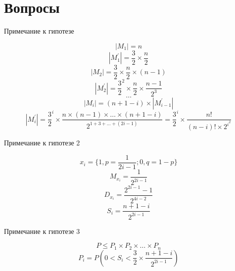 \documentclass{beamer}
\begin{document}
\section{Вопросы} 


\begin{frame}{Примечание к гипотезе}

$$|M_1| = n$$
$$|M^{'}_1| = \frac{3}{2} \times \frac{n}{2}$$
$$|M_2| = \frac{3}{2} \times \frac{n}{2} \times (n-1)$$
$$|M^{'}_2| = \frac{3}{2}^2 \times \frac{n}{2} \times \frac{n-1}{2^3}$$
$$\ldots$$
$$|M_i| = (n + 1 - i) \times |M^{'}_{i-1}|$$
$$|M^{'}_i| = \frac{3}{2}^i \times \frac{n \times (n-1) \times \ldots \times (n+1-i)}{2^{1+3+\ldots+(2i-1)}} = \frac{3}{2}^i  \times \frac{n!}{(n-i)! \times 2^{i^2}}$$
\end{frame}




\begin{frame}{Примечание к гипотезе 2}

$$x_i = \{1, p = \frac{1}{2i-1}; 0, q = 1 - p\}$$
$$M_{x_i} = \frac{1}{2^{2i - 1}}$$
$$D_{x_i} = \frac{2^{2i-1} - 1}{2^{4i - 2}}$$
$$S_i = \frac{n + 1 -i}{2^{2i - 1}}$$

\end{frame}


\begin{frame}{Примечание к гипотезе 3}

$$P \leq P_1 \times P_2 \times \ldots \times P_n$$
$$P_i = P(0 < S_i < \frac{3}{2} \times \frac{n+1-i}{2^{2i - 1}})$$ 

\end{frame}
\end{document}
